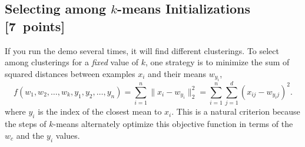 \documentclass{article}
\newcommand\pts[1]{\textcolor{pointscolour}{[#1~points]}}
\newcommand{\norm}[1]{\lVert #1 \rVert}
\begin{document}
    \subsection{Selecting among $k$-means Initializations \pts{7}}

    If you run the demo several times, it will find different clusterings. To select among clusterings for a \emph{fixed} value of $k$, one strategy is to minimize the sum of squared distances between examples $x_i$ and their means $w_{y_i}$,
    \[
    f(w_1,w_2,\dots,w_k,y_1,y_2,\dots,y_n) = \sum_{i=1}^n \norm{x_i - w_{y_i}}_2^2 = \sum_{i=1}^n \sum_{j=1}^d (x_{ij} - w_{y_ij})^2.
    \]
    where $y_i$ is the index of the closest mean to $x_i$. This is a natural criterion because the steps of $k$-means alternately optimize this objective function in terms of the $w_c$ and the $y_i$ values.
\end{document}
